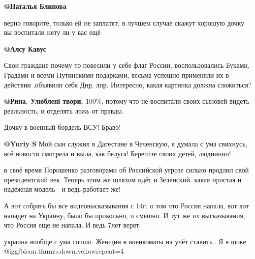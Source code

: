\begin{itemize}
\textbf{@Наталья Блинова}

верно говорите, только ей не заплатят,  в лучшем случае скажут хорошую дочку вы
воспитали нету ли у вас ещё

\textbf{@Алсу Кавус}

Свои граждане почему то повесили  у себе флаг России, воспользовались Буками,
Градами и всеми Путинскими подарками,  весьма успешно применяли их в действии
,объявили себя Днр, лнр. Интересно, какая картинка должна сложиться?

\textbf{@Рина. Улюблені твори.}  100\%, потому что не воспитали своих сыновей видеть реальность, и отделять ложь от правды.

Дочку в военный бордель ВСУ! Браво!

\textbf{@Yuriy S}  Мой сын служил в Дагестане в Чеченскую, я думала с ума
свихнусь, всё новости смотрела и выла, как белуга! Берегите своих детей,
людиииии! 

\end{itemize} %


в своё время Порошенко разговорами об Российской угрозе сильно продлил свой
президентский век. Теперь этим же шляхом идёт и Зеленский. какая простая и
надёжная модель - и ведь работает же! 

\begin{itemize} %

А вот собрать бы все видеовысказывания  с 14г. о том что Россия напала, вот вот
нападет на Украину, было бы прикольно, и смешно. И тут же их высказывания, что
Россия еще не напала. И ведь 7лет верят. 

\end{itemize} %


украина вообще с ума сошли. Женщин в военкоматы на учёт ставить.. Я в шоке..  @igg{fbicon.thumb.down.yellow}{repeat=4}  


